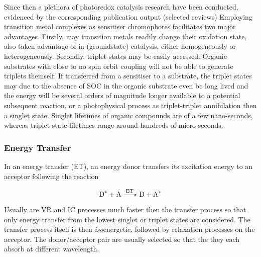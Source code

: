 		Since then a plethora of photoredox catalysis research have been conducted, evidenced by the corresponding publication output (selected reviews) %
		Employing transition metal complexes as sensitiser chromophores facilitates two major advantages. Firstly, may transition metals readily change their oxidation state, also taken advantage of in (groundstate) catalysis, either homogeneously or heterogeneously. Secondly, triplet states may be easily accessed. Organic substrates with close to no spin orbit coupling will not be able to generate triplets themself. If transferred from a sensitiser to a substrate, the triplet states may due to the absence of SOC in the organic substrate even be long lived and the energy will be several orders of magnitude longer available to a potential subsequent reaction, or a photophysical process as triplet-triplet annihilation then a singlet state. Singlet lifetimes of organic compounds are of a few nano-seconds, whereas triplet state lifetimes range around hundreds of micro-seconds.

			\subsubsection{Energy Transfer}
			\label{sec:eTrans}
			In an energy transfer (ET), an energy donor  transfers its excitation energy to an acceptor  following the reaction

			\begin{equation}
				\ce{D^{\ast} + A ->[ET] D + A^{\ast}}
			\end{equation}

			Usually are VR and IC processes much faster then the transfer process so that only energy transfer from the lowest singlet or triplet states are considered. The transfer process itself is then \textit{iso}energetic, followed by relaxation processes on the acceptor. The donor/acceptor pair are usually selected so that the they each absorb at different wavelength.

